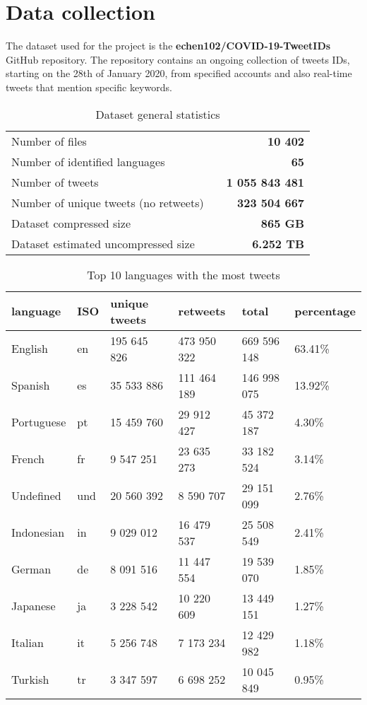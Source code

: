 \chapter{Data collection}
\label{cha:data}
The dataset used for the project is the \textbf{echen102/COVID-19-TweetIDs} GitHub repository\cite{chen2020tracking}. The repository contains an ongoing collection of tweets IDs, starting on the 28th of January 2020, from specified accounts and also real-time tweets that mention specific keywords.

\begin{table}[h]
    \centering
    \begin{tabularx}{\textwidth}{lXr}
        Number of files & & \textbf{10 402}
        \\ \lightrule
        Number of identified languages & & \textbf{65}
        \\ \lightrule
        Number of tweets & & \textbf{1 055 843 481}
        \\ \lightrule
        Number of unique tweets (no retweets) & & \textbf{323 504 667}
        \\ \lightrule
        Dataset compressed size & & \textbf{865 GB}
        \\ \lightrule
        Dataset estimated uncompressed size & & \textbf{6.252 TB}
    \end{tabularx}
    \caption{Dataset general statistics}
    \label{tab:dataset-stats}
\end{table}

\begin{table}[h]
    \centering
    \begin{tabularx}{\textwidth}{XXR{3cm}R{2.5cm}R{2.5cm}R{2.5cm}}
    		\textbf{language} & \textbf{ISO} & \textbf{unique tweets} & \textbf{retweets} & \textbf{total} & \textbf{percentage} \\
    		\midrule
        English & en & 195 645 826 & 473 950 322 & 669 596 148 & 63.41\% \\
		\lightrule
		Spanish & es & 35 533 886 & 111 464 189 & 146 998 075 & 13.92\% \\
		\lightrule
		Portuguese & pt & 15 459 760 & 29 912 427 & 45 372 187 & 4.30\% \\
		\lightrule
		French & fr & 9 547 251 & 23 635 273 & 33 182 524 & 3.14\% \\
		\lightrule
		Undefined & und & 20 560 392 & 8 590 707 & 29 151 099 & 2.76\% \\
		\lightrule
		Indonesian & in & 9 029 012 & 16 479 537 & 25 508 549 & 2.41\% \\
		\lightrule
		German & de & 8 091 516 & 11 447 554 & 19 539 070 & 1.85\% \\
		\lightrule
		Japanese & ja & 3 228 542 & 10 220 609 & 13 449 151 & 1.27\% \\
		\lightrule
		Italian & it & 5 256 748 & 7 173 234 & 12 429 982 & 1.18\% \\
		\lightrule
		Turkish & tr & 3 347 597 & 6 698 252 & 10 045 849 & 0.95\%
    \end{tabularx}
    \caption{Top 10 languages with the most tweets}
    \label{tab:dataset-stats}
\end{table}


